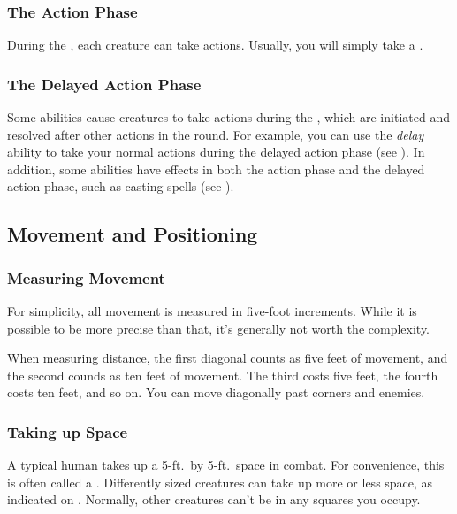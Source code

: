         \subsubsection{The Action Phase}\label{The Action Phase}
            During the , each creature can take actions.
            Usually, you will simply take a .

        \subsubsection{The Delayed Action Phase}\label{The Delayed Action Phase}
            Some abilities cause creatures to take actions during the , which are initiated and resolved after other actions in the round.
            For example, you can use the \textit{delay} ability to take your normal actions during the delayed action phase (see ).
            In addition, some abilities have effects in both the action phase and the delayed action phase, such as casting spells (see ).

    \subsection{Movement and Positioning}\label{Movement and Positioning}

        \subsubsection{Measuring Movement}

            For simplicity, all movement is measured in five-foot increments.
            While it is possible to be more precise than that, it's generally not worth the complexity.

             When measuring distance, the first diagonal counts as five feet of movement, and the second counds as ten feet of movement.
            The third costs five feet, the fourth costs ten feet, and so on.
            You can move diagonally past corners and enemies.

        \subsubsection{Taking up Space}
            A typical human takes up a 5-ft.\ by 5-ft.\ space in combat.
            For convenience, this is often called a .
            Differently sized creatures can take up more or less space, as indicated on .
            Normally, other creatures can't be in any squares you occupy.

